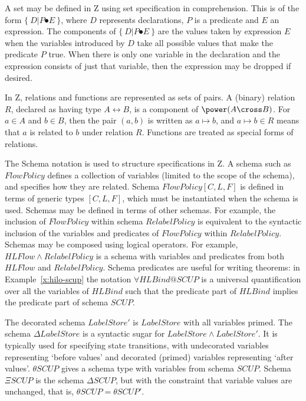 A set may be defined in Z using set specification in comprehension.
This is of the form $\{~D|P\spot E~\}$, 
where $D$ represents declarations, $P$ is a predicate and $E$ an expression.
The components of  $\{~D|P\spot E~\}$
are the values taken by expression $E$ 
when the variables introduced by $D$ take all possible
values that make the predicate $P$ true.  
When there is only one variable in the declaration 
and the expression consists of just that variable, then the
expression may be dropped if desired. 

In Z, relations and functions are represented as sets of pairs.  A
(binary) relation $R$, declared as having type $A\rel B$, is a
component of $\power (A\cross B)$.  For $a\in A$ and $b\in B$, then the
pair $(a,b)$ is written as $a\mapsto b$, and $a\mapsto b\in R$  means
that $a$ is related to $b$ under relation $R$.  Functions are treated
as special forms of  relations. 

The Schema notation is used to structure specifications in Z.  A schema
such as $FlowPolicy$ defines a collection of variables (limited to the
scope of the schema), and specifies how they are related. Schema
$FlowPolicy[C,L,F]$ is defined in terms of generic types $[C,L,F]$,
which must be instantiated when the schema is used.  Schemas may be
defined in terms of other schemas. For example, the inclusion of
$FlowPolicy$ within schema $RelabelPolicy$ is equivalent to the
syntactic inclusion of the variables and predicates of $FlowPolicy$
within $RelabelPolicy$.  Schemas may be composed using logical
operators.  For example, $HLFlow\land RelabelPolicy$ is a schema with
variables and predicates from both $HLFlow$ and $RelabelPolicy$.
Schema predicates are useful for writing theorems: in
Example~\ref{x:hilo-scup} the notation $\forall HLBind @ SCUP$ 
is a universal quantification over all   the variables
of $HLBind$ such that the predicate part of $HLBind$ implies the
predicate part of schema $SCUP$. 

The decorated schema $LabelStore'$ is $LabelStore$ with all variables
primed.   The schema $\Delta LabelStore$ is a syntactic sugar for
$LabelStore \land LabelStore'$.  It is typically used for specifying
state transitions, with undecorated variables representing `before
values' and decorated (primed) variables representing `after values'.
$\theta SCUP$ gives a schema type with variables from schema
$SCUP$. Schema $\Xi SCUP$ is the schema $\Delta SCUP$, but with the
constraint that variable values are unchanged, that is,
$\theta SCUP = \theta SCUP'$. 
 


